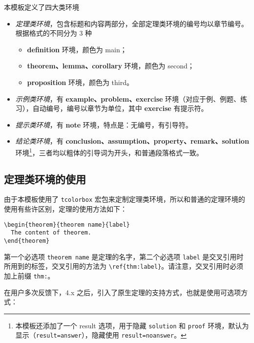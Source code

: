 \documentclass[cn,10pt,math=newtx,citestyle=gb7714-2015,bibstyle=gb7714-2015]{elegantbook}
\begin{document}
本模板定义了四大类环境

\begin{itemize}
  \item \textit{定理类环境}，包含标题和内容两部分，全部定理类环境的编号均以章节编号。根据格式的不同分为 3 种
    \begin{itemize}
      \item \textcolor{main}{\textbf{definition}} 环境，颜色为 \textcolor{main}{main}；
      \item \textcolor{second}{\textbf{theorem、lemma、corollary}} 环境，颜色为 \textcolor{second} {second}；
      \item \textcolor{third}{\textbf{proposition}} 环境，颜色为 \textcolor{third}{third}。
    \end{itemize}
  \item \textit{示例类环境}，有 \textbf{example、problem、exercise} 环境（对应于例、例题、练习），自动编号，编号以章节为单位，其中 \textbf{exercise} 有提示符。
  \item \textit{提示类环境}，有 \textbf{note} 环境，特点是：无编号，有引导符。
  \item \textit{结论类环境}，有 \textbf{conclusion、assumption、property、remark、solution} 环境\footnote{本模板还添加了一个 result 选项，用于隐藏 \lstinline{solution} 和 \lstinline{proof} 环境，默认为显示（\lstinline{result=answer}），隐藏使用 \lstinline{result=noanswer}。}，三者均以粗体的引导词为开头，和普通段落格式一致。
\end{itemize}

\subsection{定理类环境的使用}

由于本模板使用了 \lstinline{tcolorbox} 宏包来定制定理类环境，所以和普通的定理环境的使用有些许区别，定理的使用方法如下：
\begin{lstlisting}
\begin{theorem}{theorem name}{label}
  The content of theorem.
\end{theorem}
\end{lstlisting}

第一个必选项 \lstinline{theorem name} 是定理的名字，第二个必选项 \lstinline{label} 是交叉引用时所用到的标签，交叉引用的方法为 \verb|\ref{thm:label}|。请注意，交叉引用时必须加上前缀 \lstinline{thm:}。

在用户多次反馈下，4.x 之后，引入了原生定理的支持方式，也就是使用可选项方式：
\end{document}
